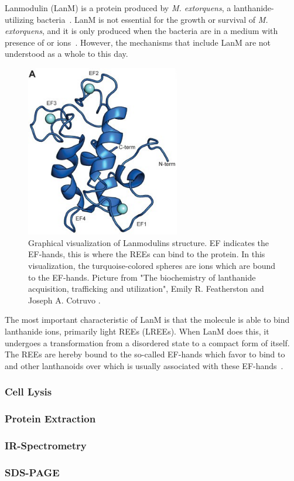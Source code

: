 Lanmodulin (LanM) is a protein produced by \textit{M. extorquens}, a lanthanide-utilizing bacteria~\cite{lanmdiscovery}.
LanM is not essential for the growth or survival of \textit{M. extorquens}, and it is only produced when the bacteria are in a medium with presence of  or  ions~\cite{lanmroleinbiology}.
However, the mechanisms that include LanM are not understood as a whole to this day.

\begin{figure}[H]
    \centering
    \includegraphics[width=0.6\textwidth]{./media/images/lanm_structure}
    \caption{Graphical visualization of Lanmodulins structure. EF indicates the EF-hands, this is where the REEs can bind to the protein. In this visualization, the turquoise-colored spheres are  ions which are bound to the EF-hands. Picture from "The biochemistry of lanthanide acquisition, trafficking and utilization", Emily R. Featherston and Joseph A. Cotruvo \cite{lanmroleinbiology}.}
    \label{fig:lanm_structure}
\end{figure}

The most important characteristic of LanM is that the molecule is able to bind lanthanide ions, primarily light REEs (LREEs).
When LanM does this, it undergoes a transformation from a disordered state to a compact form of itself.
The REEs are hereby bound to the so-called EF-hands which favor to bind to  and other lanthanoids over  which is usually associated with these EF-hands~\cite{lanmstructure}.


\subsubsection{Cell Lysis\authorB{}}


\subsubsection{Protein Extraction\authorB{}}


\subsubsection{IR-Spectrometry\authorB}

\subsubsection{SDS-PAGE\authorB{}}
